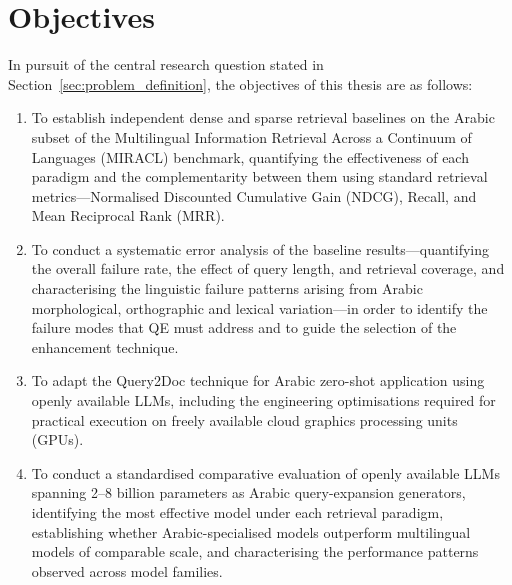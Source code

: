 \section{Objectives}
\label{sec:objectives}

In pursuit of the central research question stated in Section~\ref{sec:problem_definition}, the objectives of this thesis are as follows:

\begin{enumerate}[label=\roman*.]
    \item To establish independent dense and sparse retrieval baselines on the Arabic subset of the Multilingual Information Retrieval Across a Continuum of Languages (MIRACL) benchmark, quantifying the effectiveness of each paradigm and the complementarity between them using standard retrieval metrics---Normalised Discounted Cumulative Gain (NDCG), Recall, and Mean Reciprocal Rank (MRR).

    \item To conduct a systematic error analysis of the baseline results---quantifying the overall failure rate, the effect of query length, and retrieval coverage, and characterising the linguistic failure patterns arising from Arabic morphological, orthographic and lexical variation---in order to identify the failure modes that QE must address and to guide the selection of the enhancement technique.

    \item To adapt the Query2Doc technique for Arabic zero-shot application using openly available LLMs, including the engineering optimisations required for practical execution on freely available cloud graphics processing units (GPUs).

    \item To conduct a standardised comparative evaluation of openly available LLMs spanning 2--8 billion parameters as Arabic query-expansion generators, identifying the most effective model under each retrieval paradigm, establishing whether Arabic-specialised models outperform multilingual models of comparable scale, and characterising the performance patterns observed across model families.


\end{enumerate}
